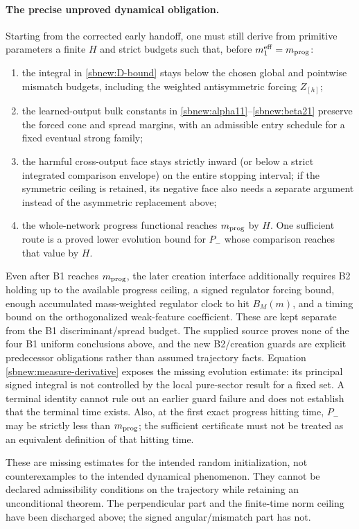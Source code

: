 \documentclass{article} %
\theoremstyle{plain}
\theoremstyle{definition}
\theoremstyle{remark}
\begin{document}
\paragraph{The precise unproved dynamical obligation.}
Starting from the corrected early handoff, one must still derive from
primitive parameters a finite $H$ and strict budgets such that, before
$m_1^{\rm eff}=m_{\rm prog}$:
\begin{enumerate}
\item the integral in \eqref{sbnew:D-bound} stays below the chosen global
and pointwise mismatch budgets, including the weighted antisymmetric
forcing $Z_{[h]}$;
\item the learned-output bulk constants in
\eqref{sbnew:alpha11}--\eqref{sbnew:beta21} preserve the forced cone and
spread margins, with an admissible entry schedule for a fixed eventual
strong family;
\item the harmful cross-output face stays strictly inward (or below a
strict integrated comparison envelope) on the entire stopping interval;
if the symmetric ceiling is retained, its negative face also needs a
separate argument instead of the asymmetric replacement above;
\item the whole-network progress functional reaches $m_{\rm prog}$ by
$H$. One sufficient route is a proved lower evolution bound for $P_-$
whose comparison reaches that value by $H$.
\end{enumerate}
Even after B1 reaches $m_{\rm prog}$, the later creation interface additionally
requires B2 holding up to the available progress ceiling, a signed regulator
forcing bound, enough accumulated mass-weighted regulator clock to hit
$B_M(m)$, and a timing bound on the orthogonalized weak-feature coefficient.
These are kept separate from the B1 discriminant/spread budget.
The supplied source proves none of the four B1 uniform conclusions above,
and the new B2/creation guards are explicit predecessor obligations rather
than assumed trajectory facts.
Equation \eqref{sbnew:measure-derivative} exposes the missing evolution
estimate: its principal signed integral is not controlled by the local
pure-sector result for a fixed set. A terminal identity cannot rule out an
earlier guard failure and does not establish that the terminal time exists.
Also, at the first exact progress hitting time, $P_-$ may be strictly less
than $m_{\rm prog}$; the sufficient certificate must not be treated as an
equivalent definition of that hitting time.

These are missing estimates for the intended random initialization, not
counterexamples to the intended dynamical phenomenon. They cannot be
declared admissibility conditions on the trajectory while retaining an
unconditional theorem. The perpendicular part and the finite-time norm
ceiling have been discharged above; the signed angular/mismatch part has
not.
\end{document}
